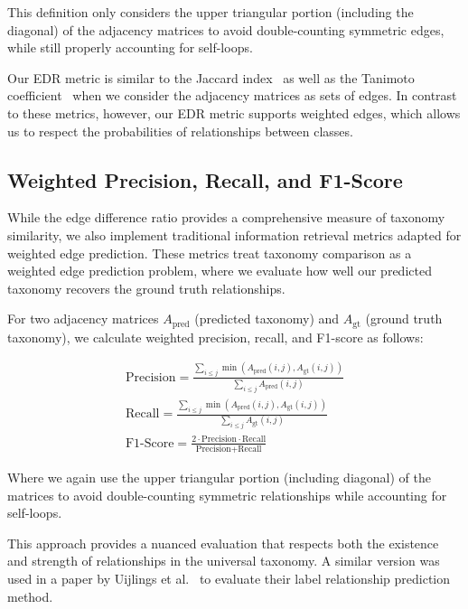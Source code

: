 This definition only considers the upper triangular portion (including the diagonal)
of the adjacency matrices to avoid double-counting symmetric edges,
while still properly accounting for self-loops.

Our EDR metric is similar to the Jaccard index~\cite{jaccard_distribution_1912} as well as the Tanimoto coefficient~\cite{tanimoto_elementary_1958}
when we consider the adjacency matrices as sets of edges.
In contrast to these metrics, however, our EDR metric supports weighted edges,
which allows us to respect the probabilities of relationships between classes.

\subsection{Weighted Precision, Recall, and F1-Score}

While the edge difference ratio provides a comprehensive measure of taxonomy similarity,
we also implement traditional information retrieval metrics adapted for weighted edge prediction.
These metrics treat taxonomy comparison as a weighted edge prediction problem,
where we evaluate how well our predicted taxonomy recovers the ground truth relationships.

For two adjacency matrices $A_{\text{pred}}$ (predicted taxonomy) and $A_{\text{gt}}$ (ground truth taxonomy),
we calculate weighted precision, recall, and F1-score as follows:

\begin{equation}
    \begin{aligned}
        \text{Precision} = \frac{\sum_{i \leq j} \min(A_{\text{pred}}(i,j), A_{\text{gt}}(i,j))}{\sum_{i \leq j} A_{\text{pred}}(i,j)} \\
        \text{Recall} = \frac{\sum_{i \leq j} \min(A_{\text{pred}}(i,j), A_{\text{gt}}(i,j))}{\sum_{i \leq j} A_{\text{gt}}(i,j)}      \\
        \text{F1-Score} = \frac{2 \cdot \text{Precision} \cdot \text{Recall}}{\text{Precision} + \text{Recall}}
    \end{aligned}
\end{equation}

Where we again use the upper triangular portion (including diagonal) of the matrices
to avoid double-counting symmetric relationships while accounting for self-loops.

This approach provides a nuanced evaluation that respects both the existence and strength
of relationships in the universal taxonomy.
A similar version was used in a paper by Uijlings et al.~\cite{uijlings_missing_2022}
to evaluate their label relationship prediction method.

